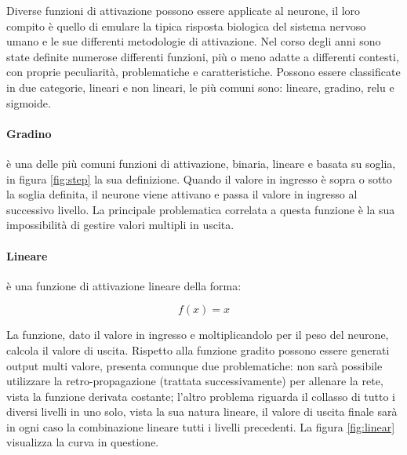\documentclass[%
    corpo=12pt,
    twoside,
    oldstyle,
    autoretitolo,
    greek,
    evenboxes,
]{toptesi}
\begin{document}
Diverse funzioni di attivazione possono essere applicate al neurone, il loro compito è quello di emulare la tipica risposta biologica del sistema nervoso umano e le sue differenti metodologie di attivazione. Nel corso degli anni sono state definite numerose differenti funzioni, più o meno adatte a differenti contesti, con proprie peculiarità, problematiche e caratteristiche. Possono essere classificate in due categorie, lineari e non lineari, le più comuni sono: lineare, gradino, relu e sigmoide.

\paragraph{Gradino} è una delle più comuni funzioni di attivazione, binaria, lineare e basata su soglia, in figura \ref{fig:step} la sua definizione. Quando il valore in ingresso è sopra o sotto la soglia definita, il neurone viene attivano e passa il valore in ingresso al successivo livello. La principale problematica correlata a questa funzione è la sua impossibilità di gestire valori multipli in uscita.

\paragraph{Lineare} è una funzione di attivazione lineare della forma:
\begin{center}
  \begin{equation}
    f(x) = x
  \end{equation}
\end{center}
La funzione, dato il valore in ingresso e moltiplicandolo per il peso del neurone, calcola il valore di uscita. Rispetto alla funzione gradito possono essere generati output multi valore, presenta comunque due problematiche: non sarà possibile utilizzare la retro-propagazione (trattata successivamente) per allenare la rete, vista la funzione derivata costante; l'altro problema riguarda il collasso di tutto i diversi livelli in uno solo, vista la sua natura lineare, il valore di uscita finale sarà in ogni caso la combinazione lineare tutti i livelli precedenti. La figura \ref{fig:linear} visualizza la curva in questione.
\end{document}
